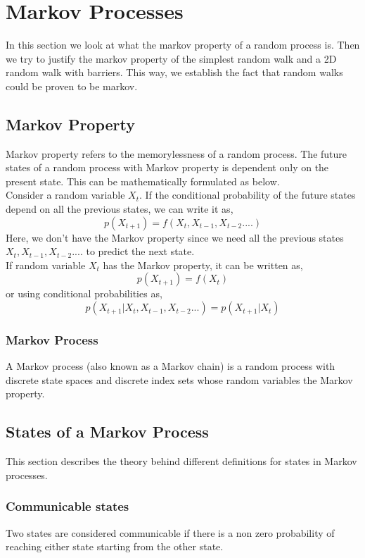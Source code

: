 \documentclass[a4paper]{article}
\begin{document}
\section{Markov Processes}
In this section we look at what the markov property of a random process is. Then we try to justify the markov property of the simplest random walk and a 2D random walk with barriers. This way, we establish the fact that random walks could be proven to be markov. 

\subsection{Markov Property}
Markov property refers to the memorylessness of a random process. The future states of a  random process with Markov property is dependent only on the present state. This can be mathematically formulated as below.\\
Consider a random variable $X_t$. If the conditional probability of the future states depend on all the previous states, we can write it as,
$$p(X_{t+1}) = f(X_t, X_{t-1}, X_{t-2} ....) $$ 
Here, we don't have the Markov property since we need all the previous states $X_t, X_{t-1}, X_{t-2} ....$ to predict the next state.\\
If random variable $X_t$ has the Markov property, it can be written as,
$$p(X_{t+1}) = f(X_t)$$
or using conditional probabilities as,
\begin{equation}
p(X_{t+1}|X_t, X_{t-1}, X_{t-2} ... ) = p(X_{t+1}|X_t)
\label{eqn:markov-property}
\end{equation}


\subsubsection{Markov Process}
A Markov process (also known as a Markov chain) is a random process with discrete state spaces and discrete index sets whose random variables the Markov property. 

\subsection{States of a Markov Process}
This section describes the theory behind different definitions for states in Markov processes.
\subsubsection{Communicable states}
Two states are considered communicable if there is a non zero probability of reaching either state starting from the other state.
\end{document}
